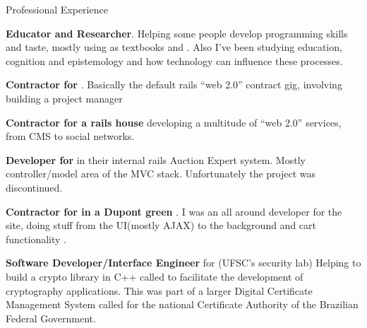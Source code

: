 \begin{rubric}{Professional Experience}{

    \entry*[2009]
        \textbf{Educator and Researcher}. Helping some people develop 
        programming skills and taste, mostly using as textbooks
         and
        .
        Also I've been studying education, cognition and epistemology and how
        technology can influence these processes. 

    \entry*[2009] 
        \textbf{Contractor for
        }. Basically the
        default rails ``web 2.0'' contract gig, involving building a project
        manager

    \entry*[2007 - 2008] 
        \textbf{Contractor for  a rails house} 
        developing a multitude of ``web 2.0'' services, from CMS to social networks.

    \entry*[2007] 
        \textbf{Developer for } 
        in their internal rails Auction Expert system. Mostly controller/model area of
        the MVC stack. Unfortunately the project was discontinued.

    \entry*[2007] 
        \textbf{Contractor for  
        in a Dupont green }.
        I was an all around developer for the site, doing stuff from the
        UI(mostly AJAX) to the background and cart functionality .

    \entry*[2005 - 2007] 
        \textbf{Software Developer/Interface Engineer} for
        (UFSC's security
        lab) Helping to build a crypto library in C++ called
        to facilitate the development of cryptography applications. This was
        part of a larger Digital Certificate Management System  called
         for the
        national Certificate Authority of the Brazilian Federal Government.

}\end{rubric}

